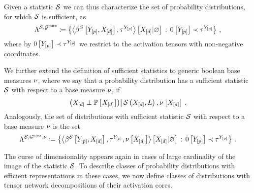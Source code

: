 Given a statistic $\mathcal{S}$  we can thus characterize the set of probability distributions, for which $\mathcal{S}$ is sufficient, as
\begin{align*} %
    \realizabledistsof{\sstat,\maxgraph}
    \coloneqq \left\{\normalizationof{\bencodingofat{\sstat}{\headvariables,\shortcatvariables},\hypercoreof{\headvariables}}{\shortcatvariables}
    \wcols \zerosat{\headvariables}\prec\hypercoreof{\headvariables} \right\} \, ,
\end{align*}
where by $0\left[Y_{[p]}\right]\prec\tau^{Y_{[p]}}$ we restrict to the activation tensors with non-negative coordinates.

We further extend the definition of sufficient statistics to generic boolean base measures $\nu$, where we say that a probability distribution has a sufficient statistic $\mathcal{S}$ with respect to a base measure $\nu$, if
\begin{align*}
    \left(X_{[d]}\perp\mathbb{P}\left[X_{[d]}\right]\middle)\right| \mathcal{S}\left(X_{[d]},L\right),\nu\left[X_{[d]}\right] \, .
\end{align*}
Analogously, the set of distributions with sufficient statistic $\mathcal{S}$ with respect to a base measure $\nu$ is the set
\begin{align*} %
    \realizabledistsof{\sstat,\maxgraph,\basemeasure}
    \coloneqq \left\{\normalizationof{\bencodingofat{\sstat}{\headvariables,\shortcatvariables},\hypercoreof{\headvariables},\basemeasureat{\shortcatvariables}}{\shortcatvariables}
    \wcols \zerosat{\headvariables}\prec\hypercoreof{\headvariables} \right\} \, .
\end{align*}


\label{sec:computationActivationNetworks}

The curse of dimensionality appears again in cases of large cardinality of the image of the statistic $\mathcal{S}$.
To describe classes of probability distributions with efficient representations in these cases, we now define classes of distributions with tensor network decompositions of their activation cores.

